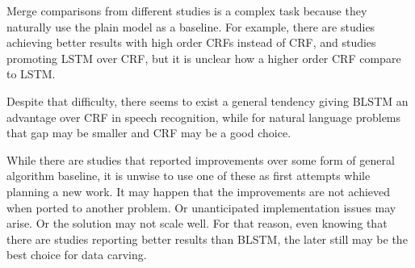 \begin{enumerate}
    Merge comparisons from different studies is a complex task because they naturally use the plain model as a baseline. For example, there are studies achieving better results with high order CRFs instead of CRF, and studies promoting LSTM over CRF, but it is unclear how a higher order CRF compare to LSTM.
    
    Despite that difficulty, there seems to exist a general tendency giving BLSTM an advantage over CRF in speech recognition, while for natural language problems that gap may be smaller and CRF may be a good choice.
    
    While there are studies that reported improvements over some form of general algorithm baseline, it is unwise to use one of these as first attempts while planning a new work. It may happen that the improvements are not achieved when ported to another problem. Or unanticipated implementation issues may arise. Or the solution may not scale well. For that reason, even knowing that there are studies reporting better results than BLSTM, the later still may be the best choice for data carving.
\end{enumerate}
